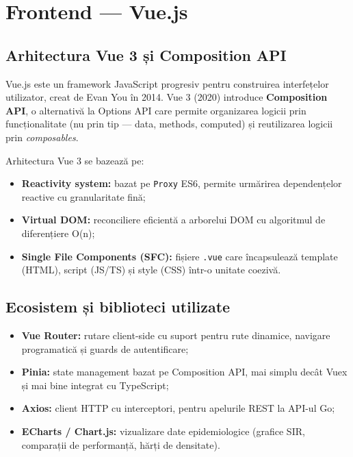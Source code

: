 \section{Frontend — Vue.js}
\label{sec:vuejs}

\subsection{Arhitectura Vue 3 și Composition API}
\label{subsec:vue_arhitectura}

Vue.js \cite{vuejs2024} este un framework JavaScript progresiv pentru construirea
interfețelor utilizator, creat de Evan You în 2014. Vue 3 (2020) introduce
\textbf{Composition API}, o alternativă la Options API care permite organizarea
logicii prin funcționalitate (nu prin tip --- data, methods, computed) și
reutilizarea logicii prin \emph{composables}.

Arhitectura Vue 3 se bazează pe:
\begin{itemize}
    \item \textbf{Reactivity system:} bazat pe \texttt{Proxy} ES6, permite
    urmărirea dependențelor reactive cu granularitate fină;
    \item \textbf{Virtual DOM:} reconciliere eficientă a arborelui DOM cu
    algoritmul de diferențiere O(n);
    \item \textbf{Single File Components (SFC):} fișiere \texttt{.vue}
    care încapsulează template (HTML), script (JS/TS) și style (CSS)
    într-o unitate coezivă.
\end{itemize}

\subsection{Ecosistem și biblioteci utilizate}
\label{subsec:vue_ecosistem}

\begin{itemize}
    \item \textbf{Vue Router:} rutare client-side cu suport pentru rute
    dinamice, navigare programatică și guards de autentificare;
    \item \textbf{Pinia:} state management bazat pe Composition API, mai
    simplu decât Vuex și mai bine integrat cu TypeScript;
    \item \textbf{Axios:} client HTTP cu interceptori, pentru apelurile
    REST la API-ul Go;
    \item \textbf{ECharts / Chart.js:} vizualizare date epidemiologice
    (grafice SIR, comparații de performanță, hărți de densitate).
\end{itemize}
